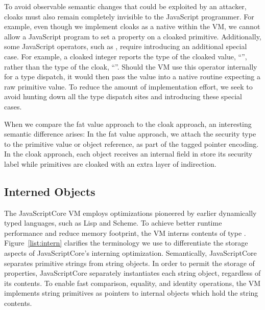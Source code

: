 To avoid observable semantic changes that could be exploited by an attacker, cloaks must also remain completely invisible to the JavaScript programmer.
For example, even though we implement cloaks as a native  within the VM, we cannot allow a JavaScript program to set a property on a cloaked primitive.
Additionally, some JavaScript operators, such as , require introducing an additional special case.
For example, a cloaked integer reports the type of the cloaked value, ``'', rather than the type of the cloak, ``''.
Should the VM use this operator internally for a type dispatch, it would then pass the value into a native routine expecting a raw primitive value.
To reduce the amount of implementation effort, we seek to avoid hunting down all the type dispatch sites and introducing these special cases.

When we compare the fat value approach to the cloak approach, an interesting semantic difference arises:
In the fat value approach, we attach the security type to the primitive value or object reference, as part of the tagged pointer encoding.
In the cloak approach, each object receives an internal field in store its security label while primitives are cloaked with an extra layer of indirection.


\subsection{Interned Objects}\label{sec:interned-objects}


The JavaScriptCore VM employs optimizations pioneered by earlier dynamically typed languages, such as Lisp and Scheme.
To achieve better runtime performance and reduce memory footprint, the VM interns contents of type .
Figure~\ref{list:intern} clarifies the terminology we use to differentiate the storage aspects of JavaScriptCore's interning optimization.
Semantically, JavaScriptCore separates primitive strings from string objects.
In order to permit the storage of properties, JavaScriptCore separately instantiates each string object, regardless of its contents.
To enable fast comparison, equality, and identity operations, the VM implements string primitives as pointers to internal  objects which hold the string contents.

